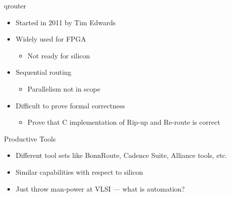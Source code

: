 \documentclass[9pt]{beamer}
\begin{document}
\begin{frame}{qrouter}
	\begin{itemize}
        \setlength\itemsep{1em}
		\item Started in 2011 by Tim Edwards 
		\item Widely used for FPGA
	        \begin{itemize}
		    \item Not ready for silicon
	        \end{itemize}
		\item Sequential routing
	        \begin{itemize}
		    \item Parallelism not in scope
	        \end{itemize}
		\item Difficult to prove formal correctness
	        \begin{itemize}
		    \item Prove that C implementation of Rip-up and Re-route is correct
	        \end{itemize}
	\end{itemize}
\end{frame}

\begin{frame}{Productive Tools}
	\begin{itemize}
        \setlength\itemsep{1em}
		\item Different tool sets like BonnRoute, Cadence Suite, Alliance tools, etc.
		\item Similar capabilities with respect to silicon
		\item Just throw man-power at VLSI --- what is automation?
	\end{itemize}
\end{frame}
\end{document}
